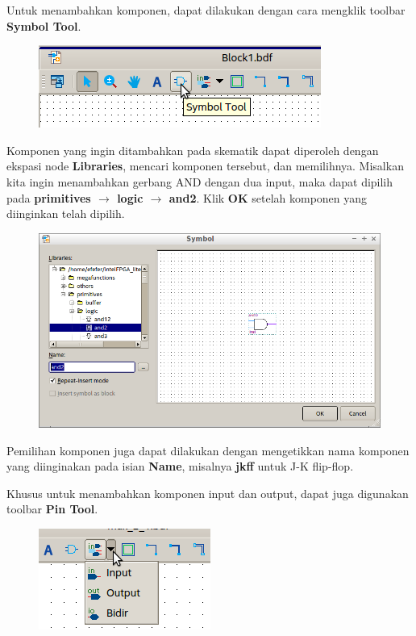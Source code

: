 Untuk menambahkan komponen, dapat dilakukan dengan cara mengklik toolbar
\textbf{Symbol Tool}.

\begin{figure}[H]
\centering
\includegraphics[scale=0.5]{images/SymbolTool.png}
\par
\end{figure}

Komponen yang ingin ditambahkan pada skematik dapat diperoleh dengan
ekspasi node \textbf{Libraries}, mencari komponen tersebut, dan memilihnya.
Misalkan kita ingin menambahkan gerbang AND dengan dua input, maka dapat dipilih
pada \textbf{primitives $\rightarrow$ logic $\rightarrow$ and2}. Klik
\textbf{OK} setelah komponen yang diinginkan telah dipilih.

\begin{figure}[H]
\centering
\includegraphics[scale=0.5]{images/BlockAnd.png}
\par
\end{figure}

Pemilihan komponen juga dapat dilakukan dengan mengetikkan nama komponen yang
diinginakan pada isian \textbf{Name}, misalnya \textbf{jkff} untuk J-K flip-flop.

Khusus untuk menambahkan komponen input dan output, dapat juga digunakan
toolbar \textbf{Pin Tool}.
\begin{figure}[H]
\centering
\includegraphics[scale=0.5]{images/PinTool.png}
\par
\end{figure}

